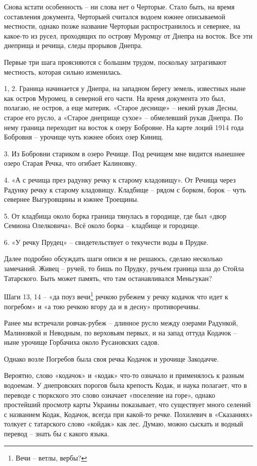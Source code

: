 Снова кстати особенность – ни слова нет о Черторые. Стало быть, на время составления документа, Черторыей считался водоем южнее описываемой местности, однако позже название Черторыи распространилось и севернее, на какое-то из русел, проходящих по острову Муромцу от Днепра на восток. Все эти днеприща и речища, следы прорывов Днепра.

Первые три шага проясняются с большим трудом, поскольку затрагивают местность, которая сильно изменилась.
 
1, 2. Граница начинается у Днепра, на западном берегу земель, известных ныне как остров Муромец, в северной его части. На время документа это был, полагаю, не остров, а еще материк. «Старое деснище» – некий рукав Десны, старое его русло, а «Старое днеприще сухое» – обмелевший рукав Днепра. По нему граница переходит на восток к озеру Бобровне. На карте лоций 1914 года Бобровня – урочище чуть южнее обоих озер Кинищ.

3. Из Бобровни стариком в озеро Речище. Под речищем мне видится нынешнее озеро Старая Речка, что огибает Калиновку.

4. «А с речища през радунку речку к старому кладовищу». От Речища через Радунку речку к старому кладовищу. Кладбище – рядом с борком, борок – чуть севернее Выгуровщины и южнее Троещины. 


5. От кладбища около борка граница тянулась в городище, где был «двор Семиона Олелковича». Всё около борка – кладбище и городище.

6. «У речку Прудец» – свидетельствует о текучести воды в Прудке.

Далее подробно обсуждать шаги описи я не решаюсь, сделаю несколько замечаний. Живец – ручей, то бишь по Прудку, ручьем граница шла до Стойла Татарского. Быть может память, что там останавливался Меньгукан?%

Шаги 13, 14 – «да поуз вечи\footnote{Вечи – ветлы, вербы?} речкою рубежем у речку кодачок что идет к погребом» и «а тою речкою вгору да и в десну» противоречивы.

Ранее мы встречали ровчак-рубеж – длинное русло между озерами Радункой, Малиновкой и Неводным, по верховьям первых, и на запад оттуда Кодачок – ныне урочище Горбачиха около Русановских садов.

Однако возле Погребов была своя речка Кодачок и урочище Закодачче.

Вероятно, слово «кодачок» и «кодак» что-то означало и применялось к разным водоемам. У днепровских порогов была крепость Кодак, и  наука полагает, что в переводе с тюркского это слово означает «поселение на горе», однако простейший просмотр карты Украины показывает, что существует много селений с названием Кодак, Кодачок, всегда при какой-то речке. Похилевич в «Сказаниях» толкует с татарского слово «койдак» как лес. Думаю, можно сыскать и водный перевод – знать бы с какого языка. 

